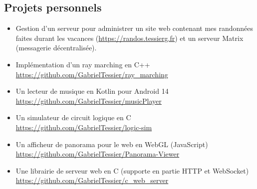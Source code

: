 \documentclass[10pt,oneside,a4paper,titlepage]{article}
\begin{document}
\begin{tcolorbox}
\begin{minipage}[t]{11.6cm}
\begin{tcolorbox}[grow to right by=0.75cm,colframe=white,colback=white]
      \section*{Projets personnels}
      \begin{itemize}
      \item Gestion d'un serveur pour administrer un site web contenant mes randonnées faites durant les vacances (\href{https://randos.tessierg.fr}{https://randos.tessierg.fr}) et un serveur Matrix (messagerie décentralisée).
      \item Implémentation d'un ray marching en C++\\ \href{https://github.com/GabrielTessier/ray_marching}{https://github.com/GabrielTessier/ray\_marching}
      \item Un lecteur de musique en Kotlin pour Android 14\\ \href{https://github.com/GabrielTessier/musicPlayer}{https://github.com/GabrielTessier/musicPlayer}
      \item Un simulateur de circuit logique en C\\ \href{https://github.com/GabrielTessier/logic-sim}{https://github.com/GabrielTessier/logic-sim}
      \item Un afficheur de panorama pour le web en WebGL (JavaScript)\\ \href{https://github.com/GabrielTessier/Panorama-Viewer}{https://github.com/GabrielTessier/Panorama-Viewer}
      \item Une librairie de serveur web en C (supporte en partie HTTP et WebSocket)\\ \href{https://github.com/GabrielTessier/c_web_server}{https://github.com/GabrielTessier/c\_web\_server}
      \end{itemize}
      

\end{tcolorbox}
\end{minipage}
\end{tcolorbox}
\end{document}
